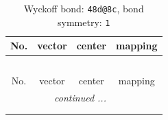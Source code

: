 \documentclass[fleqn,8pt]{jsarticle}
\begin{document}
\renewcommand{\arraystretch}{1.2}
\begin{longtable}{cccc}
\caption{Wyckoff bond: {\tt 48d@8c}, bond symmetry: {\tt 1}}
 \\
 \hline \hline
No. & vector & center & mapping \\ \hline \endfirsthead

\multicolumn{3}{l}{\tablename\ \thetable{}} \\
 \hline \hline
No. & vector & center & mapping \\ \hline \endhead

 \hline \hline
\multicolumn{3}{r}{\footnotesize\it continued ...} \\ \endfoot

 \hline \hline
\multicolumn{3}{r}{} \\ \endlastfoot


\end{longtable}
\end{document}

